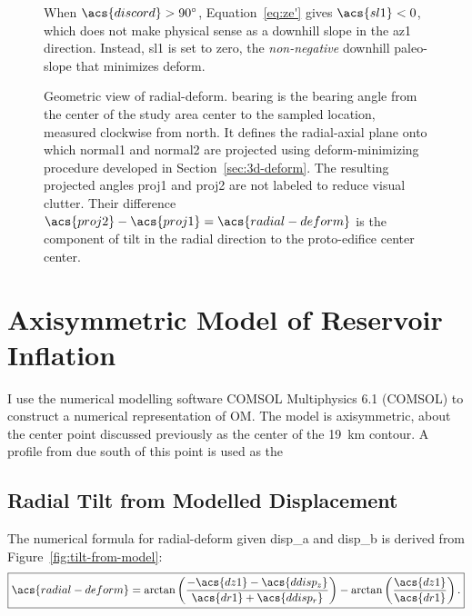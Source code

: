 \begin{figure}
    {\caption[Reversal case: $\acs{discord}>\ang{90}$]{When $\acs{discord}>\ang{90}$, Equation~\eqref{eq:ze'} gives $\acs{sl1}<0$, which does not make physical sense as a downhill slope in the \acs{az1} direction. Instead, \acs{sl1} is set to zero, the \emph{non-negative} downhill paleo-slope that minimizes \acs{deform}.}\label{fig:reversal}}
    {\hspace*{-0.4\linewidth}}
    \vspace*{-9em}
    {\caption[Calculation of \acf{radial-deform} from mapping]{Geometric view of \acl{radial-deform}. \acs{bearing} is the bearing angle from the center of the study area \acs{center} to the sampled location, measured clockwise from \acf{north}. It defines the radial-axial plane onto which \acs{normal1} and \acs{normal2} are projected using \acs{deform}-minimizing procedure developed in Section~\ref{sec:3d-deform}. The resulting projected angles \acs{proj1} and \acs{proj2} are not labeled to reduce visual clutter. Their difference $\acs{proj2}-\acs{proj1}=\acs{radial-deform}$ is the component of tilt in the radial direction to the proto-edifice center \acs{center}.}\label{fig:radial}}
    {}
\end{figure}

\section{Axisymmetric Model of Reservoir Inflation}

I use the numerical modelling software COMSOL Multiphysics 6.1 (COMSOL) to construct a numerical representation of \acf{OM}. The model is axisymmetric, about the center point discussed previously as the center of the \qty{19}{\km} contour. A profile from due south of this point is used as the 

\subsection{Radial Tilt from Modelled Displacement}

The numerical formula for \acf{radial-deform} given \acs{disp_a} and \acs{disp_b} is derived from Figure~\ref{fig:tilt-from-model}:
\begin{equation}
    \boxed{\acs{radial-deform} = 
    \arctan\left(\dfrac{-\acs{dz1}-\acs{ddisp_z}}{\acs{dr1}+\acs{ddisp_r}}\right) - \arctan\left(\frac{\acs{dz1}}{\acs{dr1}}\right).}\label{eq:tilt-from-model}
\end{equation}

